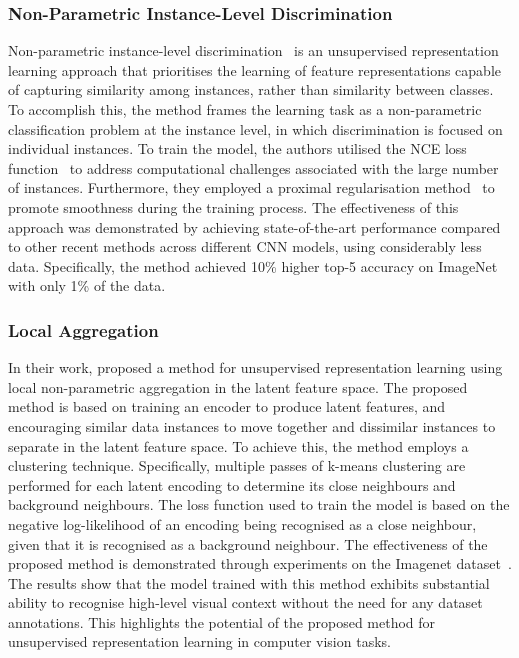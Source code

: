 \subsubsection{Non-Parametric Instance-Level Discrimination}
\label{subsubsec:non-parametric_instance-level_discrimination}
Non-parametric instance-level discrimination~\citep{wu2018unsupervised} is an unsupervised representation learning approach that prioritises the learning of feature representations capable of capturing similarity among instances, rather than similarity between classes. To accomplish this, the method frames the learning task as a non-parametric classification problem at the instance level, in which discrimination is focused on individual instances. To train the model, the authors utilised the NCE loss function~\citep{gutmann2010noise} to address computational challenges associated with the large number of instances. Furthermore, they employed a proximal regularisation method~\citep{parikh2014proximal} to promote smoothness during the training process. The effectiveness of this approach was demonstrated by achieving state-of-the-art performance compared to other recent methods across different CNN models, using considerably less data. Specifically, the method achieved 10\% higher top-5 accuracy on ImageNet~\citep{deng2009imagenet} with only 1\% of the data.

\subsubsection{Local Aggregation}
\label{subsubsec:local_aggregation}
In their work, \cite{zhuang2019local} proposed a method for unsupervised representation learning using local non-parametric aggregation in the latent feature space. The proposed method is based on training an encoder to produce latent features, and encouraging similar data instances to move together and dissimilar instances to separate in the latent feature space. To achieve this, the method employs a clustering technique. Specifically, multiple passes of k-means clustering are performed for each latent encoding to determine its close neighbours and background neighbours. The loss function used to train the model is based on the negative log-likelihood of an encoding being recognised as a close neighbour, given that it is recognised as a background neighbour. The effectiveness of the proposed method is demonstrated through experiments on the Imagenet dataset~\citep{deng2009imagenet}. The results show that the model trained with this method exhibits substantial ability to recognise high-level visual context without the need for any dataset annotations. This highlights the potential of the proposed method for unsupervised representation learning in computer vision tasks.

